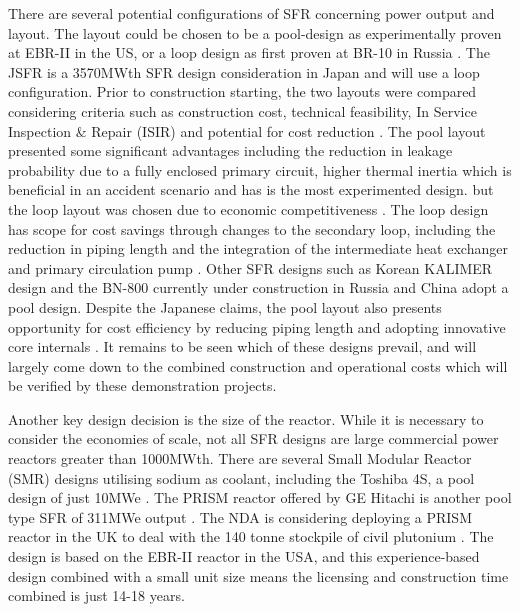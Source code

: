 \documentclass[journal]{IEEEtran}
\begin{document}
There are several potential configurations of SFR concerning power output and layout. 
The layout could be chosen to be a pool-design as experimentally proven at EBR-II in the US, or a loop design as first proven at BR-10 in Russia \cite{Int2012}. 
The JSFR is a 3570MWth SFR design consideration in Japan and will use a loop configuration. 
Prior to construction starting, the two layouts were compared considering criteria such as construction cost, technical feasibility, In Service Inspection \& Repair (ISIR) and potential for cost reduction \cite{Sakamoto2013194}.
The pool layout presented some significant advantages including the reduction in leakage probability due to a fully enclosed primary circuit, higher thermal inertia which is beneficial in an accident scenario and has is the most experimented design.
but the loop layout was chosen due to economic competitiveness \cite{Locatelli2013}. 
The loop design has scope for cost savings through changes to the secondary loop, including the reduction in piping length and the integration of the intermediate heat exchanger and primary circulation pump \cite{Sakamoto2013194}. 
Other SFR designs such as Korean KALIMER design and the BN-800 currently under construction in Russia and China adopt a pool design. Despite the Japanese claims, the pool layout also presents opportunity for cost efficiency by reducing piping length and adopting innovative core internals \cite{Locatelli2013}. It remains to be seen which of these designs prevail, and will largely come down to the combined construction and operational costs which will be verified by these demonstration projects.

Another key design decision is the size of the reactor. 
While it is necessary to consider the economies of scale, not all SFR designs are large commercial power reactors greater than 1000MWth.
There are several Small Modular Reactor (SMR) designs utilising sodium as coolant, including the Toshiba 4S, a pool design of just 10MWe \cite{Locatelli2013}. 
The PRISM reactor offered by GE Hitachi is another pool type SFR of 311MWe output \cite{Locatelli2013}. 
The NDA is considering deploying a PRISM reactor in the UK to deal with the 140 tonne stockpile of civil plutonium \cite{NDA14}. 
The design is based on the EBR-II reactor in the USA, and this experience-based design combined with a small unit size means the licensing and construction time combined is just 14-18 years\cite{NDA14}.
\end{document}
